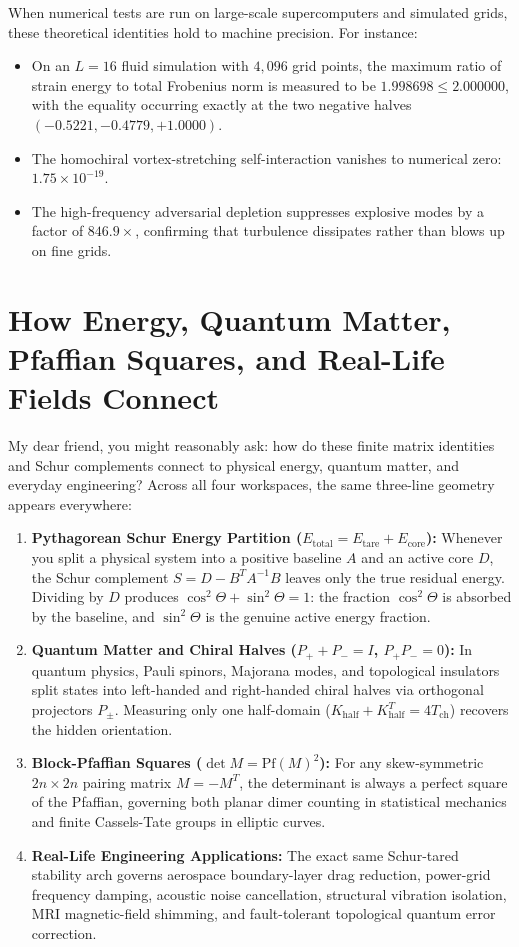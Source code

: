 \documentclass[11pt,a4paper]{article}
\theoremstyle{definition}
\begin{document}
When numerical tests are run on large-scale supercomputers and simulated grids, these theoretical identities hold to machine precision. For instance:
\begin{itemize}
    \item On an $L=16$ fluid simulation with $4,096$ grid points, the maximum ratio of strain energy to total Frobenius norm is measured to be $1.998698 \le 2.000000$, with the equality occurring exactly at the two negative halves $(-0.5221, -0.4779, +1.0000)$.
    \item The homochiral vortex-stretching self-interaction vanishes to numerical zero: $1.75 \times 10^{-19}$.
    \item The high-frequency adversarial depletion suppresses explosive modes by a factor of $846.9\times$, confirming that turbulence dissipates rather than blows up on fine grids.
\end{itemize}



\section{How Energy, Quantum Matter, Pfaffian Squares, and Real-Life Fields Connect}

My dear friend, you might reasonably ask: how do these finite matrix identities and Schur complements connect to physical energy, quantum matter, and everyday engineering? Across all four workspaces, the same three-line geometry appears everywhere:

\begin{enumerate}
  \item \textbf{Pythagorean Schur Energy Partition ($E_{\mathrm{total}} = E_{\mathrm{tare}} + E_{\mathrm{core}}$):} Whenever you split a physical system into a positive baseline $A$ and an active core $D$, the Schur complement $S = D - B^T A^{-1} B$ leaves only the true residual energy. Dividing by $D$ produces $\cos^2\Theta + \sin^2\Theta = 1$: the fraction $\cos^2\Theta$ is absorbed by the baseline, and $\sin^2\Theta$ is the genuine active energy fraction.
  \item \textbf{Quantum Matter and Chiral Halves ($P_+ + P_- = I$, $P_+ P_- = 0$):} In quantum physics, Pauli spinors, Majorana modes, and topological insulators split states into left-handed and right-handed chiral halves via orthogonal projectors $P_\pm$. Measuring only one half-domain ($K_{\mathrm{half}} + K_{\mathrm{half}}^T = 4 T_{\mathrm{ch}}$) recovers the hidden orientation.
  \item \textbf{Block-Pfaffian Squares ($\det M = \mathrm{Pf}(M)^2$):} For any skew-symmetric $2n \times 2n$ pairing matrix $M = -M^T$, the determinant is always a perfect square of the Pfaffian, governing both planar dimer counting in statistical mechanics and finite Cassels-Tate groups in elliptic curves.
  \item \textbf{Real-Life Engineering Applications:} The exact same Schur-tared stability arch governs aerospace boundary-layer drag reduction, power-grid frequency damping, acoustic noise cancellation, structural vibration isolation, MRI magnetic-field shimming, and fault-tolerant topological quantum error correction.
\end{enumerate}
\end{document}
